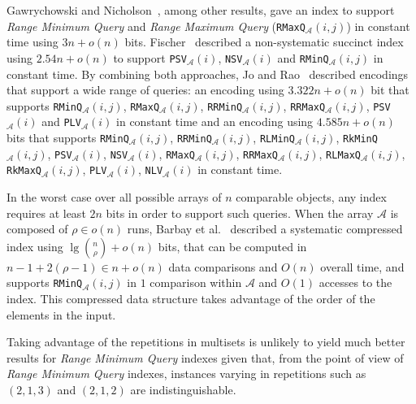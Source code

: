 Gawrychowski and
Nicholson~\cite{2015-ICALP-OptimalEncodingsForRangeTopKSelectionAndMinMax-GawrychowskiNicholson},
among other results, gave an index to support \emph{Range Minimum
  Query} and \emph{Range Maximum Query}
(\texttt{RMaxQ}$_{\mathcal{A}}(i,j)$) in constant time using
$3n + o(n)$ bits.
Fischer~\cite{2011-TCS-CombinedDataStructureForPreviousAndNextSmallerValues-Fischer}
described a non-systematic succinct index using $2.54n + o(n)$ to
support \texttt{PSV}$_{\mathcal{A}}(i)$,
\texttt{NSV}$_{\mathcal{A}}(i)$ and
\texttt{RMinQ}$_{\mathcal{A}}(i,j)$ in constant time. By combining both approaches, Jo
and
Rao~\cite{2015-COCOON-SimultaneousEncodingsForRangeAndNextPreviousLargerSmallerValueQueries-JoRao}
described encodings that support a wide range of queries: an encoding
using $3.322n + o(n)$ bit that supports
\texttt{RMinQ}$_{\mathcal{A}}(i,j)$,
\texttt{RMaxQ}$_{\mathcal{A}}(i,j)$,
\texttt{RRMinQ}$_{\mathcal{A}}(i,j)$,
\texttt{RRMaxQ}$_{\mathcal{A}}(i,j)$, \texttt{PSV}$_{\mathcal{A}}(i)$
and \texttt{PLV}$_{\mathcal{A}}(i)$ in constant time and an encoding
using $4.585n + o(n)$ bits that supports
\texttt{RMinQ}$_{\mathcal{A}}(i,j)$,
\texttt{RRMinQ}$_{\mathcal{A}}(i,j)$,
\texttt{RLMinQ}$_{\mathcal{A}}(i,j)$,
\texttt{RkMinQ}$_{\mathcal{A}}(i,j)$, \texttt{PSV}$_{\mathcal{A}}(i)$,
\texttt{NSV}$_{\mathcal{A}}(i)$, \texttt{RMaxQ}$_{\mathcal{A}}(i,j)$,
\texttt{RRMaxQ}$_{\mathcal{A}}(i,j)$,
\texttt{RLMaxQ}$_{\mathcal{A}}(i,j)$,
\texttt{RkMaxQ}$_{\mathcal{A}}(i,j)$, \texttt{PLV}$_{\mathcal{A}}(i)$,
\texttt{NLV}$_{\mathcal{A}}(i)$ in constant time.

In the worst case over all possible arrays of $n$ comparable objects,
any index requires at least $2n$ bits in order to support such
queries.
% 
When the array ${\mathcal{A}}$ is composed of $\rho \in o(n)$ runs,
Barbay et
al.~\cite{2012-TCS-LRMTreesCompressedIndicesAdaptiveSortingAndCompressedPermutations-BarbayFischerNavarro}
described a systematic compressed index using
$\lg{n\choose \rho} + o(n)$ bits, that can be computed in
$n-1+2(\rho-1) \in n+o(n)$ data comparisons and $O(n)$ overall time,
and supports \texttt{RMinQ}$_{\mathcal{A}}(i,j)$ in $1$ comparison
within ${\mathcal{A}}$ and $O(1)$ accesses to the index. This
compressed data structure takes advantage of the order of the elements
in the input.

Taking advantage of the repetitions in multisets is unlikely to yield
much better results for \emph{Range Minimum Query} indexes given that,
from the point of view of \emph{Range Minimum Query} indexes,
instances varying in repetitions such as $(2,1,3)$ and $(2, 1, 2)$ are
indistinguishable.

